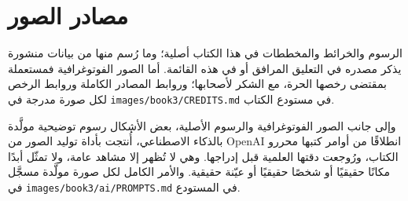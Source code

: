 \chapter*{مصادر الصور}

الرسوم والخرائط والمخططات في هذا الكتاب أصلية؛ وما رُسم منها من بيانات
منشورة يذكر مصدره في التعليق المرافق أو في هذه القائمة. أما الصور
الفوتوغرافية فمستعملة بمقتضى رخصها الحرة، مع الشكر لأصحابها؛ وروابط المصادر
الكاملة وروابط الرخص لكل صورة مدرجة في \texttt{images/book3/CREDITS.md} في
مستودع الكتاب.

\bigskip
وإلى جانب الصور الفوتوغرافية والرسوم الأصلية، بعض الأشكال رسوم توضيحية
مولَّدة بالذكاء الاصطناعي، أُنتجت بأداة توليد الصور من OpenAI انطلاقًا من
أوامر كتبها محررو الكتاب، ورُوجعت دقتها العلمية قبل إدراجها. وهي لا تُظهر
إلا مشاهد عامة، ولا تمثّل أبدًا مكانًا حقيقيًا أو شخصًا حقيقيًا أو عيّنة
حقيقية. والأمر الكامل لكل صورة مولَّدة مسجَّل في
\texttt{images/book3/ai/PROMPTS.md} في المستودع.

